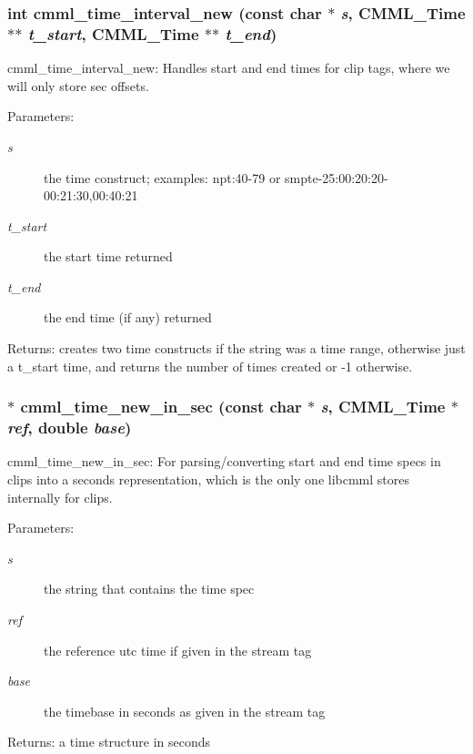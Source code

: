 \subsubsection{\setlength{\rightskip}{0pt plus 5cm}int cmml\_\-time\_\-interval\_\-new (const char $\ast$ {\em s}, {\bf CMML\_\-Time} $\ast$$\ast$ {\em t\_\-start}, {\bf CMML\_\-Time} $\ast$$\ast$ {\em t\_\-end})}\label{cmml_8h_a100}


cmml\_\-time\_\-interval\_\-new: Handles start and end times for clip tags, where we will only store sec offsets.

\begin{Desc}
\item[Parameters:]
\begin{description}
\item[{\em s}]the time construct; examples: npt:40-79 or smpte-25:00:20:20-00:21:30,00:40:21 \item[{\em t\_\-start}]the start time returned \item[{\em t\_\-end}]the end time (if any) returned\end{description}
\end{Desc}
\begin{Desc}
\item[Returns:]creates two time constructs if the string was a time range, otherwise just a t\_\-start time, and returns the number of times created or -1 otherwise. \end{Desc}
\subsubsection{$\ast$ cmml\_\-time\_\-new\_\-in\_\-sec (const char $\ast$ {\em s}, {\bf CMML\_\-Time} $\ast$ {\em ref}, double {\em base})}\label{cmml_8h_a101}


cmml\_\-time\_\-new\_\-in\_\-sec: For parsing/converting start and end time specs in clips into a seconds representation, which is the only one libcmml stores internally for clips.

\begin{Desc}
\item[Parameters:]
\begin{description}
\item[{\em s}]the string that contains the time spec \item[{\em ref}]the reference utc time if given in the stream tag \item[{\em base}]the timebase in seconds as given in the stream tag\end{description}
\end{Desc}
\begin{Desc}
\item[Returns:]a time structure in seconds \end{Desc}

